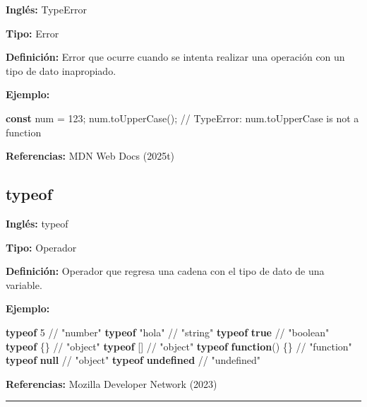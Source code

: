 \documentclass[
  letterpaper,
  DIV=11,
  numbers=noendperiod]{scrreprt}
\newenvironment{Shaded}{\begin{snugshade}}{\end{snugshade}}
\newcommand{\CommentTok}[1]{\textcolor[rgb]{0.37,0.37,0.37}{#1}}
\newcommand{\DecValTok}[1]{\textcolor[rgb]{0.68,0.00,0.00}{#1}}
\newcommand{\FunctionTok}[1]{\textcolor[rgb]{0.28,0.35,0.67}{#1}}
\newcommand{\KeywordTok}[1]{\textcolor[rgb]{0.00,0.23,0.31}{\textbf{#1}}}
\newcommand{\NormalTok}[1]{\textcolor[rgb]{0.00,0.23,0.31}{#1}}
\newcommand{\OperatorTok}[1]{\textcolor[rgb]{0.37,0.37,0.37}{#1}}
\newcommand{\StringTok}[1]{\textcolor[rgb]{0.13,0.47,0.30}{#1}}
\let\oldsubsection\subsection
\renewcommand{\subsection}{\phantomsection\oldsubsection}
\begin{document}
\textbf{Inglés:} TypeError

\textbf{Tipo:} Error

\textbf{Definición:} Error que ocurre cuando se intenta realizar una
operación con un tipo de dato inapropiado.

\textbf{Ejemplo:}

\begin{Shaded}
\begin{Highlighting}[]
\KeywordTok{const}\NormalTok{ num }\OperatorTok{=} \DecValTok{123}\OperatorTok{;}
\NormalTok{num}\OperatorTok{.}\FunctionTok{toUpperCase}\NormalTok{()}\OperatorTok{;} 
\CommentTok{// TypeError: num.toUpperCase is not a function}
\end{Highlighting}
\end{Shaded}

\textbf{Referencias:} MDN Web Docs (2025t)

\subsection*{typeof}\label{glos-typeof}

\textbf{Inglés:} typeof

\textbf{Tipo:} Operador

\textbf{Definición:} Operador que regresa una cadena con el tipo de dato
de una variable.

\textbf{Ejemplo:}

\begin{Shaded}
\begin{Highlighting}[]
\KeywordTok{typeof} \DecValTok{5} \CommentTok{// "number"}
\KeywordTok{typeof} \StringTok{"hola"} \CommentTok{// "string"}
\KeywordTok{typeof} \KeywordTok{true} \CommentTok{// "boolean"}
\KeywordTok{typeof}\NormalTok{ \{\} }\CommentTok{// "object"}
\KeywordTok{typeof}\NormalTok{ [] }\CommentTok{// "object"}
\KeywordTok{typeof} \KeywordTok{function}\NormalTok{() \{\} }\CommentTok{// "function"}
\KeywordTok{typeof} \KeywordTok{null} \CommentTok{// "object"}
\KeywordTok{typeof} \KeywordTok{undefined} \CommentTok{// "undefined"}
\end{Highlighting}
\end{Shaded}

\textbf{Referencias:} Mozilla Developer Network (2023)

\begin{center}\rule{0.5\linewidth}{0.5pt}\end{center}
\end{document}
